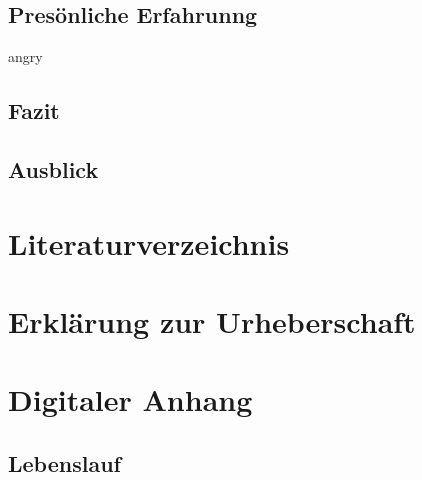 \documentclass[a4paper,12pt]{article}
\begin{document}
\subsection{Presönliche Erfahrunng}
angry
\subsection{Fazit}

\subsection{Ausblick}


\newpage
%
\section{Literaturverzeichnis}


\newpage
\section{Erklärung zur Urheberschaft}


\newpage
\listoffigures


\listoftables %
\newpage
\section{Digitaler Anhang}

\subsection*{Lebenslauf}

\end{document}

